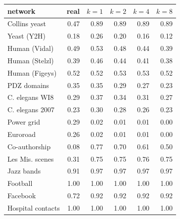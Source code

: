 \begin{tabular}{lrrrrr}
\hline\hline
network & real & $k=1$ & $k=2$ & $k=4$ & $k=8$\\
\hline
Collins yeast & 0.47 & 0.89 & 0.89 & 0.89 & 0.89\\
Yeast (Y2H) & 0.18 & 0.26 & 0.20 & 0.16 & 0.12\\
Human (Vidal) & 0.49 & 0.53 & 0.48 & 0.44 & 0.39\\
Human (Stelzl) & 0.39 & 0.46 & 0.44 & 0.41 & 0.38\\
Human (Figeys) & 0.52 & 0.52 & 0.53 & 0.53 & 0.52\\
PDZ domains & 0.35 & 0.35 & 0.29 & 0.27 & 0.23\\
C. elegans WI8 & 0.29 & 0.37 & 0.34 & 0.31 & 0.27\\
C. elegans 2007 & 0.23 & 0.30 & 0.28 & 0.26 & 0.23\\
Power grid & 0.29 & 0.02 & 0.01 & 0.01 & 0.00\\
Euroroad & 0.26 & 0.02 & 0.01 & 0.01 & 0.00\\
Co-authorship & 0.08 & 0.77 & 0.70 & 0.61 & 0.50\\
Les Mis. scenes & 0.31 & 0.75 & 0.75 & 0.76 & 0.75\\
Jazz bands & 0.91 & 0.97 & 0.97 & 0.97 & 0.97\\
Football & 1.00 & 1.00 & 1.00 & 1.00 & 1.00\\
Facebook & 0.72 & 0.92 & 0.92 & 0.92 & 0.92\\
Hospital contacts & 1.00 & 1.00 & 1.00 & 1.00 & 1.00\\
\hline\hline
\end{tabular}

